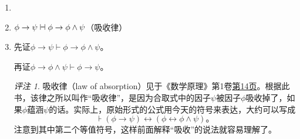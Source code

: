 \documentclass[punct=custom/kaiming,fontset=none]{ctexart}
\makeatletter
\newcommand*{\vdashv}{\mathrel{\ooalign{$\vdash$\cr\hskip1pt\reflectbox{$\vdash$}}}}
\renewenvironment{proof}[1][\proofname]{\par
  \pushQED{\qed}%
  \normalfont \topsep6\p@\@plus6\p@\relax
  \trivlist
  \item[\hskip\labelsep
    \bfseries
    #1%
    ]\ignorespaces
}{%
  \popQED\endtrivlist\@endpefalse
}
\theoremstyle{remark}
\newtheorem*{remark}{评注}
\let\asserts⊦
\let\proves\vdash
\makeatother
\begin{document}
\begin{description}
\begin{enumerate}
\begin{proof}
      \begin{ND}
        \label{1}
        \label{2}
        \label{3}
        \label{4}
        \label{5}
        \label{6}
      \end{ND}
    \end{proof}
  \item \(\phi \to \psi \vdashv \phi \to \phi \land \psi\)\hfill（吸收律）
    \begin{proof}
      先证\(\phi \to \psi \proves \phi \to \phi \land \psi\)。
      \begin{ND}
        \label{1}
        \label{2}
      \end{ND}
      再证\(\phi \to \phi \land \psi \proves \phi \to \psi\)。
      \begin{ND}
        \label{1}
        \label{2}
      \end{ND}
      \begin{remark}
        吸收律（law of absorption）见于《数学原理》第1卷\href{https://hdl.handle.net/2027/miun.aat3201.0001.001?urlappend=%3Bseq=36}{第14页}。根据此书，该律之所以叫作“吸收律”，是因为合取式中的因子\(\psi\)被因子\(\phi\)吸收掉了，如果\(\phi\)蕴涵\(\psi\)的话。实际上，原始形式的公式用今天的符号来表达，大约可以写成
        \begin{equation*}
          \asserts
          (\phi \to \psi)
          \leftrightarrow
          (\phi \leftrightarrow \phi \land \psi)。
        \end{equation*}
        注意到其中第二个等值符号，这样前面解释“吸收”的说法就容易理解了。
      \end{remark}

\end{proof}
\end{enumerate}
\end{description}
\end{document}
